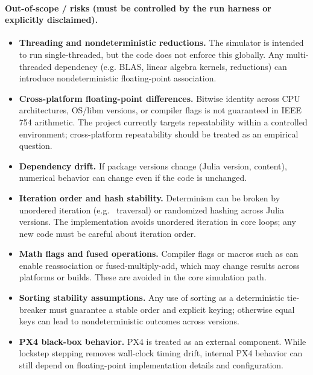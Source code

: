 \paragraph{Out-of-scope / risks (must be controlled by the run harness or explicitly disclaimed).}
\begin{itemize}[leftmargin=*]
  \item \textbf{Threading and nondeterministic reductions.} The simulator is intended to run single-threaded, but the code does not enforce this globally. Any multi-threaded dependency (e.g. BLAS, linear algebra kernels, reductions) can introduce nondeterministic floating-point association.
  \item \textbf{Cross-platform floating-point differences.} Bitwise identity across CPU architectures, OS/libm versions, or compiler flags is not guaranteed in IEEE 754 arithmetic. The project currently targets repeatability within a controlled environment; cross-platform repeatability should be treated as an empirical question.
  \item \textbf{Dependency drift.} If package versions change (Julia version,  content), numerical behavior can change even if the code is unchanged.
  \item \textbf{Iteration order and hash stability.} Determinism can be broken by unordered iteration (e.g.\  traversal) or randomized hashing across Julia versions. The implementation avoids unordered iteration in core loops; any new code must be careful about iteration order.
  \item \textbf{Math flags and fused operations.} Compiler flags or macros such as  can enable reassociation or fused-multiply-add, which may change results across platforms or builds. These are avoided in the core simulation path.
  \item \textbf{Sorting stability assumptions.} Any use of sorting as a deterministic tie-breaker must guarantee a stable order and explicit keying; otherwise equal keys can lead to nondeterministic outcomes across versions.
  \item \textbf{PX4 black-box behavior.} PX4 is treated as an external component. While lockstep stepping removes wall-clock timing drift, internal PX4 behavior can still depend on floating-point implementation details and configuration.
\end{itemize}

